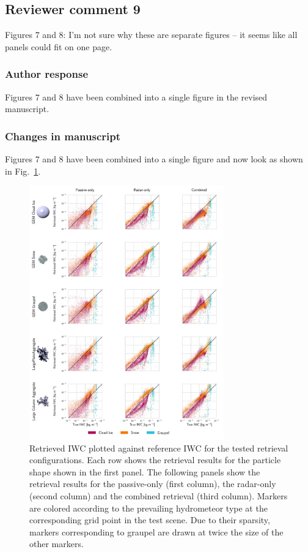\subsection*{Reviewer comment 9}

Figures 7 and 8:  I’m not sure why these are separate figures – it seems like all panels could fit on one page.

\subsubsection*{Author response}

Figures 7 and 8 have been combined into a single figure in the revised
manuscript.


\subsubsection*{Changes in manuscript}

Figures 7 and 8 have been combined into a single figure and now look as shown in
Fig.~\ref{fig:results_scatter_a}.

\begin{figure}
\centering \includegraphics[width = 0.75\textwidth]{../plots/results_scatter_a}
\caption{Retrieved IWC plotted against reference IWC for the tested retrieval
  configurations. Each row shows the retrieval results for the particle shape
  shown in the first panel. The following panels show the retrieval results for
  the passive-only (first column), the radar-only (second column) and the
  combined retrieval (third column). Markers are colored according to the
  prevailing hydrometeor type at the corresponding grid point in the test
  scene. Due to their sparsity, markers corresponding to graupel are drawn at
  twice the size of the other markers.}
\label{fig:results_scatter_a}
\end{figure}

